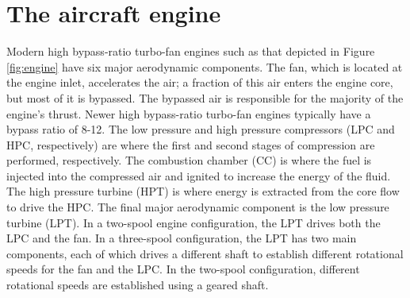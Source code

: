 \section{The aircraft engine}
Modern high bypass-ratio turbo-fan engines such as that depicted in Figure \ref{fig:engine} have six major {\color{red}aerodynamic} components. The fan, which is located at the engine inlet, accelerates the air; a fraction of this air enters the engine core, but most of it is bypassed. The bypassed air is responsible for the majority of the engine's thrust. Newer high bypass-ratio turbo-fan engines typically have a bypass ratio of 8-12. The low pressure and high pressure compressors (LPC and HPC, respectively) are where the first and second stages of compression are performed, respectively. The combustion chamber (CC) is where the fuel is injected into the compressed air and ignited to increase the energy of the fluid. The high pressure turbine (HPT) is where energy is extracted from the core flow to drive the HPC. The final major aerodynamic component is the low pressure turbine (LPT). In a two-spool engine configuration, the LPT drives both the LPC and the fan. In a three-spool configuration, the LPT has two main components, each of which drives a different shaft to establish different rotational speeds for the fan and the LPC. In the two-spool configuration, different rotational speeds are established using a geared shaft.

